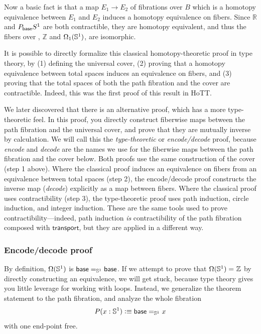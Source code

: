 Now a basic fact is that a map $E_1\to E_2$ of fibrations over $B$
which is a homotopy equivalence between $E_1$ and $E_2$ induces a
homotopy equivalence on fibers.  Since $\mathbb{R}$ and $P_{\base} S^1$
are both contractible, they are homotopy equivalent, and thus the fibers
over \base, $\mathbb{Z}$ and $\Omega_1(\Sn ^1)$, are isomorphic.

\smallskip

It is possible to directly formalize this classical homotopy-theoretic
proof in type theory, by (1) defining the universal cover, (2) proving
that a homotopy equivalence between total spaces induces an equivalence
on fibers, and (3) proving that the total spaces of both the path
fibration and the cover are contractible. Indeed, this was the first
proof of this result in HoTT.

We later discovered that there is an alternative proof, which has a more
type-theoretic feel.  In this proof, you directly construct fiberwise
maps between the path fibration and the universal cover, and prove that
they are mutually inverse by calculation.  We will call this the
\emph{type-theoretic} or \emph{encode/decode} proof, because
\emph{encode} and \emph{decode} are the names we use for the fiberwise
maps between the path fibration and the cover below.  Both proofs use
the same construction of the cover (step 1 above).  Where the classical
proof induces an equivalence on fibers from an equivalence between total
spaces (step 2), the encode/decode proof constructs the inverse map
(\emph{decode}) explicitly as a map between fibers.  Where the classical
proof uses contractibility (step 3), the type-theoretic proof uses path
induction, circle induction, and integer induction.  These are the same
tools used to prove contractibility---indeed, path induction \emph{is}
contractibility of the path fibration composed with
$\mathsf{transport}$, but they are applied in a different way.

\subsubsection{Encode/decode proof}

By definition, $\Omega(\Sn ^1)$ is $\id[\Sn ^1] \base \base$.  If we
attempt to prove that $\id {\Omega(\Sn ^1)} {\mathbb{Z}}$ by directly
constructing an equivalence, we will get stuck, because type theory
gives you little leverage for working with loops.  Instead, we
generalize the theorem statement to the path fibration, and analyze the
whole fibration
\[
P(x:\Sn ^1) \defeq \id[\Sn ^1] \base x
\]
with one end-point free.  

